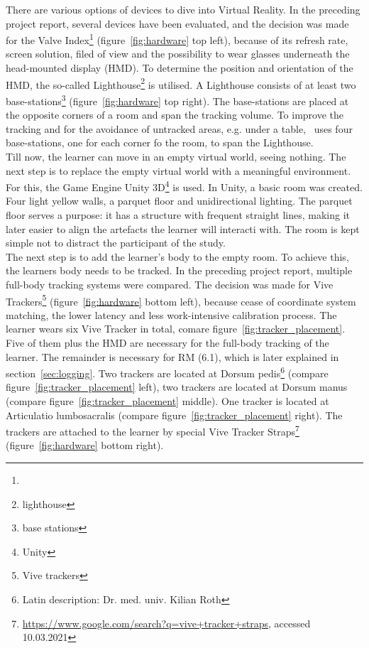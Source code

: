 There are various options of devices to dive into Virtual Reality. In the preceding project report, several devices have been evaluated, and the decision was made for the Valve Index\footnote{} (figure~\ref{fig:hardware} top left), because of its refresh rate, screen solution, filed of view and the possibility to wear glasses underneath the head-mounted display (HMD). To determine the position and orientation of the HMD, the so-called Lighthouse\footnote{lighthouse} is utilised. A Lighthouse consists of at least two base-stations\footnote{base stations} (figure~\ref{fig:hardware} top right). The base-stations are placed at the opposite corners of a room and span the tracking volume. To improve the tracking and for the avoidance of untracked areas, e.g. under a table, \exgo\ uses four base-stations, one for each corner fo the room, to span the Lighthouse.\\
Till now, the learner can move in an empty virtual world, seeing nothing. The next step is to replace the empty virtual world with a meaningful environment. For this, the Game Engine Unity 3D\footnote{Unity} is used. In Unity, a basic room was created. Four light yellow walls, a parquet floor and unidirectional lighting. The parquet floor serves a purpose: it has a structure with frequent straight lines, making it later easier to align the artefacts the learner will interacti with. The room is kept simple not to distract the participant of the study.\\
The next step is to add the learner's body to the empty room. To achieve this, the learners body needs to be tracked. In the preceding project report, multiple full-body tracking systems were compared. The decision was made for Vive Trackers\footnote{Vive trackers} (figure~\ref{fig:hardware} bottom left), because cease of coordinate system matching, the lower latency and less work-intensive calibration process. The learner wears six Vive Tracker in total, comare figure~\ref{fig:tracker_placement}. Five of them plus the HMD are necessary for the full-body tracking of the learner. The remainder is necessary for RM (6.1), which is later explained in section~\ref{sec:logging}. Two trackers are located at Dorsum pedis\footnote{\label{fn:latin}Latin description: Dr. med. univ. Kilian Roth} (compare figure~\ref{fig:tracker_placement} left), two trackers are located at Dorsum manus (compare figure~\ref{fig:tracker_placement} middle). One  tracker is located at Articulatio lumbosacralis (compare figure~\ref{fig:tracker_placement} right). The trackers are attached to the learner by special Vive Tracker Straps\footnote{\href{https://www.google.com/search?q=vive+tracker+straps}{https://www.google.com/search?q=vive+tracker+straps}, accessed 10.03.2021} (figure~\ref{fig:hardware} bottom right).\\
